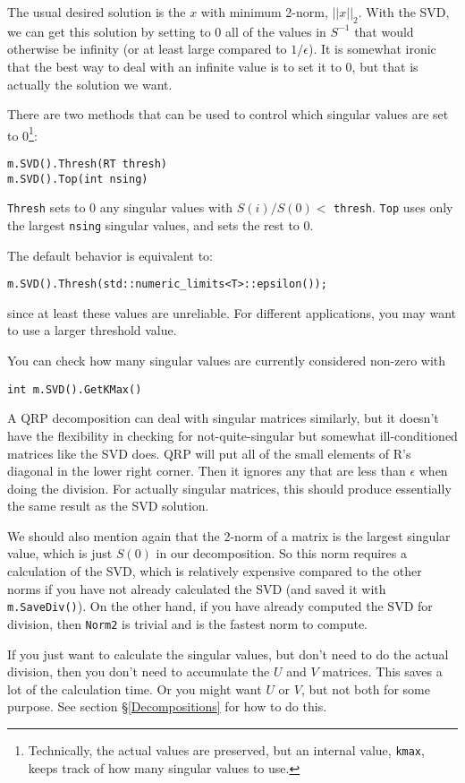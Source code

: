 \documentclass[twoside,letterpaper,11pt]{article}
\renewcommand{\tt}[1]{{\texttt {#1}}}
\begin{document}
The usual desired solution is the $x$ with minimum 2-norm, $||x||_2$.
With the SVD, we can get this solution by setting to 0 all of the values
in $S^{-1}$ that would otherwise be infinity (or at least large compared
to $1/\epsilon$).  It is somewhat ironic that the best way to deal with 
an infinite value is to set it to 0, but that is actually the solution we want.

There are two methods that can be used to control which 
singular values are set to 0\footnote{Technically, the actual values are preserved,
but an internal value, \tt{kmax}, keeps track of how many singular values to use.}:
\begin{verbatim}
m.SVD().Thresh(RT thresh)
m.SVD().Top(int nsing)
\end{verbatim}
\tt{Thresh} sets to 0 any singular values with $S(i)/S(0) <$ \tt{thresh}.
\tt{Top} uses only the largest \tt{nsing} singular values, and sets the rest to 0.

The default behavior is equivalent to:
\begin{verbatim}
m.SVD().Thresh(std::numeric_limits<T>::epsilon());
\end{verbatim}
since at least these values are unreliable.  For different applications,
you may want to use a larger threshold value.

You can check how many singular values are currently considered non-zero with
\begin{verbatim}
int m.SVD().GetKMax()
\end{verbatim}

A QRP decomposition can deal with singular matrices similarly,
but it doesn't have the flexibility in checking for not-quite-singular
but somewhat ill-conditioned matrices like the SVD does.
QRP will put all of the small elements of R's diagonal in the 
lower right corner.  Then it ignores any that are less than 
$\epsilon$ when doing the division.  For actually singular matrices,
this should produce essentially the same result as the SVD solution.

We should also mention again that the 2-norm of a matrix is the 
largest singular value, which is just $S(0)$ in our decomposition.
So this norm requires a calculation of the
SVD, which is relatively expensive compared to the other norms
if you have not already calculated the SVD
(and saved it with \tt{m.SaveDiv()}).  On the other hand, if you have already
computed the SVD for division, then \tt{Norm2} is trivial and is the fastest norm to compute.

If you just want to calculate the singular values,
but don't need to do the actual division, then you don't need to 
accumulate the $U$ and $V$ matrices.  This saves a lot of the 
calculation time.  Or you might want $U$ or $V$, but not both for 
some purpose.  See section \S\ref{Decompositions} for how to do this.
\end{document}
